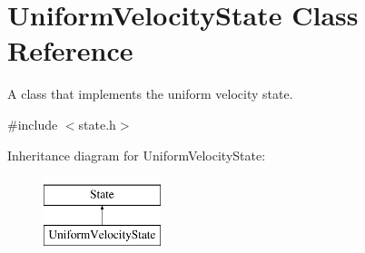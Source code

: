 \hypertarget{classUniformVelocityState}{\section{Uniform\-Velocity\-State Class Reference}
\label{classUniformVelocityState}
}


A class that implements the uniform velocity state.  




{\ttfamily \#include $<$state.\-h$>$}

Inheritance diagram for Uniform\-Velocity\-State\-:\begin{figure}[H]
\begin{center}
\leavevmode
\includegraphics[height=2.000000cm]{classUniformVelocityState}
\end{center}
\end{figure}
